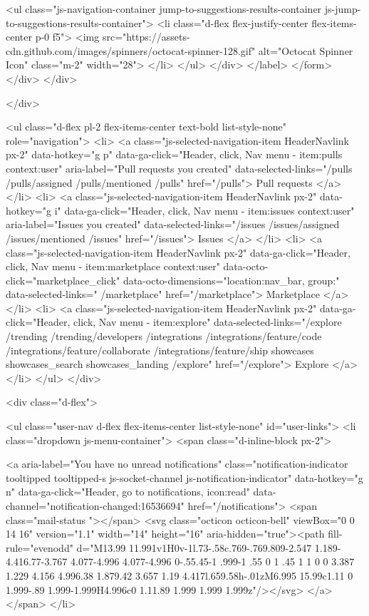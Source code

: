              <ul class="js-navigation-container jump-to-suggestions-results-container js-jump-to-suggestions-results-container">
                <li class="d-flex flex-justify-center flex-items-center p-0 f5">
                  <img src="https://assets-cdn.github.com/images/spinners/octocat-spinner-128.gif" alt="Octocat Spinner Icon" class="m-2" width="28">
                </li>
              </ul>
            </div>
      </label>
</form>  </div>
</div>

            </div>

          <ul class="d-flex pl-2 flex-items-center text-bold list-style-none" role="navigation">
            <li>
              <a class="js-selected-navigation-item HeaderNavlink px-2" data-hotkey="g p" data-ga-click="Header, click, Nav menu - item:pulls context:user" aria-label="Pull requests you created" data-selected-links="/pulls /pulls/assigned /pulls/mentioned /pulls" href="/pulls">
                Pull requests
</a>            </li>
            <li>
              <a class="js-selected-navigation-item HeaderNavlink px-2" data-hotkey="g i" data-ga-click="Header, click, Nav menu - item:issues context:user" aria-label="Issues you created" data-selected-links="/issues /issues/assigned /issues/mentioned /issues" href="/issues">
                Issues
</a>            </li>
                <li>
                  <a class="js-selected-navigation-item HeaderNavlink px-2" data-ga-click="Header, click, Nav menu - item:marketplace context:user" data-octo-click="marketplace_click" data-octo-dimensions="location:nav_bar, group:" data-selected-links=" /marketplace" href="/marketplace">
                    Marketplace
</a>                </li>
            <li>
              <a class="js-selected-navigation-item HeaderNavlink px-2" data-ga-click="Header, click, Nav menu - item:explore" data-selected-links="/explore /trending /trending/developers /integrations /integrations/feature/code /integrations/feature/collaborate /integrations/feature/ship showcases showcases_search showcases_landing /explore" href="/explore">
                Explore
</a>            </li>
          </ul>
      </div>

      <div class="d-flex">
        
<ul class="user-nav d-flex flex-items-center list-style-none" id="user-links">
  <li class="dropdown js-menu-container">
    <span class="d-inline-block  px-2">
      
    <a aria-label="You have no unread notifications" class="notification-indicator tooltipped tooltipped-s  js-socket-channel js-notification-indicator" data-hotkey="g n" data-ga-click="Header, go to notifications, icon:read" data-channel="notification-changed:16536694" href="/notifications">
        <span class="mail-status "></span>
        <svg class="octicon octicon-bell" viewBox="0 0 14 16" version="1.1" width="14" height="16" aria-hidden="true"><path fill-rule="evenodd" d="M13.99 11.991v1H0v-1l.73-.58c.769-.769.809-2.547 1.189-4.416.77-3.767 4.077-4.996 4.077-4.996 0-.55.45-1 .999-1 .55 0 1 .45 1 1 0 0 3.387 1.229 4.156 4.996.38 1.879.42 3.657 1.19 4.417l.659.58h-.01zM6.995 15.99c1.11 0 1.999-.89 1.999-1.999H4.996c0 1.11.89 1.999 1.999 1.999z"/></svg>
</a>
    </span>
  </li>

